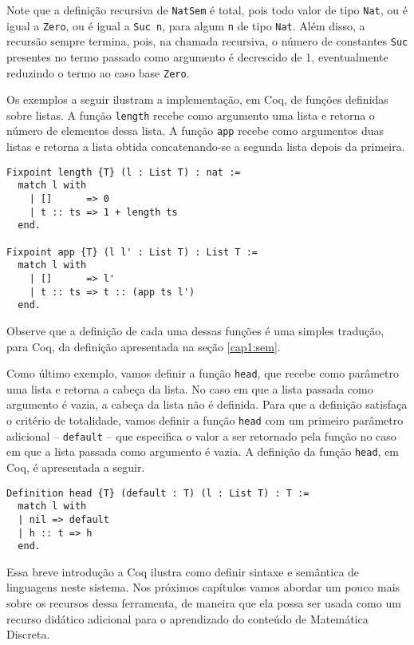 Note que a definição recursiva de \texttt{NatSem} \'e total, pois todo valor de tipo \texttt{Nat}, ou \'e igual a \texttt{Zero}, ou é igual a \texttt{Suc n}, para algum \texttt{n} de tipo \texttt{Nat}. Além disso, a recursão sempre termina, pois, na chamada recursiva, o  n\'umero de constantes \texttt{Suc} presentes no termo passado como argumento é decrescido de 1, eventualmente reduzindo o termo ao caso base \texttt{Zero}.

Os exemplos a seguir ilustram a implementação, em Coq, de funções definidas sobre listas. A função \texttt{length} recebe como argumento uma lista e retorna o número de elementos dessa lista. A função \texttt{app} recebe como argumentos duas listas e retorna a lista obtida concatenando-se a segunda lista depois da primeira.

\begin{lstlisting}
Fixpoint length {T} (l : List T) : nat :=
  match l with
    | []      => 0
    | t :: ts => 1 + length ts
  end.

Fixpoint app {T} (l l' : List T) : List T :=
  match l with
    | []      => l'
    | t :: ts => t :: (app ts l')
  end.
\end{lstlisting}

Observe que a defini\c{c}\~ao de cada uma dessas fun\c{c}\~oes é uma simples
tradu\c{c}\~ao, para Coq, da definição apresentada na se\c{c}\~ao \ref{cap1:sem}.

Como último exemplo, vamos definir a função \texttt{head}, que recebe como parâmetro uma lista e retorna a cabeça da lista. No caso em que a lista passada como argumento é vazia, a cabeça da lista não é definida. Para que a definição satisfaça o critério de totalidade, vamos definir a função \texttt{head} com um primeiro parâmetro adicional -- \texttt{default} -- que especifica o valor a ser retornado pela função no caso em que a lista passada como argumento é vazia. A definição da função \texttt{head}, em Coq, é apresentada a seguir.

\begin{lstlisting}
Definition head {T} (default : T) (l : List T) : T :=
  match l with
  | nil => default
  | h :: t => h
  end.
\end{lstlisting}

Essa breve introdução a Coq ilustra como definir sintaxe e semântica de linguagens neste sistema. Nos próximos capítulos vamos abordar um pouco mais sobre os recursos dessa ferramenta, de maneira que ela possa ser usada como um recurso did\'atico adicional para o aprendizado do conte\'udo de Matem\'atica Discreta.

